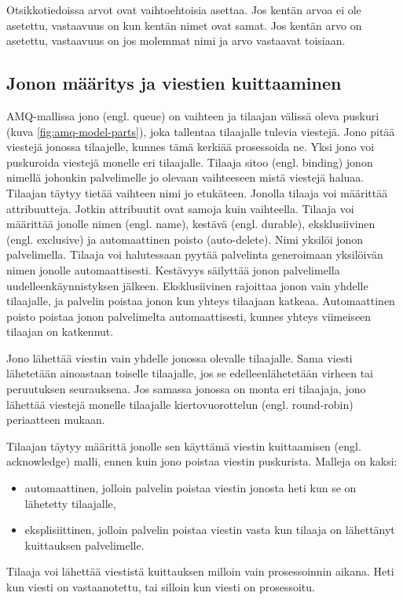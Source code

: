 Otsikkotiedoissa arvot ovat vaihtoehtoisia asettaa. Jos kentän arvoa ei ole asetettu, vastaavuus on kun kentän nimet ovat samat. Jos kentän arvo on asetettu, vastaavuus on jos molemmat nimi ja arvo vastaavat toisiaan. \cite[s.~28]{AMQP-specification}


\subsection{Jonon määritys ja viestien kuittaaminen}
AMQ-mallissa jono (engl. queue) on vaihteen ja tilaajan välissä oleva puskuri (kuva \ref{fig:amq-model-parts}), joka tallentaa tilaajalle tulevia viestejä. Jono pitää viestejä jonossa tilaajelle, kunnes tämä kerkiää prosessoida ne. Yksi jono voi puskuroida viestejä monelle eri tilaajalle. Tilaaja sitoo (engl. binding) jonon nimellä johonkin palvelimelle jo olevaan vaihteeseen mistä viestejä haluaa. Tilaajan täytyy tietää vaihteen nimi jo etukäteen. Jonolla tilaaja voi määrittää attribuutteja. Jotkin attribuutit ovat samoja kuin vaihteella. Tilaaja voi määrittää jonolle nimen (engl. name), kestävä (engl. durable), eksklusiivinen (engl. exclusive) ja automaattinen poisto (auto-delete). Nimi yksilöi jonon palvelimella. Tilaaja voi halutessaan pyytää palvelinta generoimaan yksilöivän nimen jonolle automaattisesti. Kestävyys säilyttää jonon palvelimella uudelleenkäynnistyksen jälkeen. Eksklusiivinen rajoittaa jonon vain yhdelle tilaajalle, ja palvelin poistaa jonon kun yhteys tilaajaan katkeaa. Automaattinen poisto poistaa jonon palvelimelta automaattisesti, kunnes yhteys viimeiseen tilaajan on katkennut. \cite{RabbitMQ-AMQP-0-9-1-Model-Explained}

Jono lähettää viestin vain yhdelle jonossa olevalle tilaajalle. Sama viesti lähetetään ainoastaan toiselle tilaajalle, jos se edelleenlähetetään virheen tai peruutuksen seurauksena. Jos samassa jonossa on monta eri tilaajaja, jono lähettää viestejä monelle tilaajalle kiertovuorottelun (engl. round-robin) periaatteen mukaan. \cite[s.~11--12]{AMQP-specification}

Tilaajan täytyy määrittä jonolle sen käyttämä viestin kuittaamisen (engl. acknowledge) malli, ennen kuin jono poistaa viestin puskurista. Malleja on kaksi:
\begin{itemize}
	\item automaattinen, jolloin palvelin poistaa viestin jonosta heti kun se on lähetetty tilaajalle,
	\item eksplisiittinen, jolloin palvelin poistaa viestin vasta kun tilaaja on lähettänyt kuittauksen palvelimelle.
\end{itemize}
Tilaaja voi lähettää viestistä kuittauksen milloin vain prosessoinnin aikana. Heti kun viesti on vastaanotettu, tai silloin kun viesti on prosessoitu. \cite[s.~29]{AMQP-specification}



















